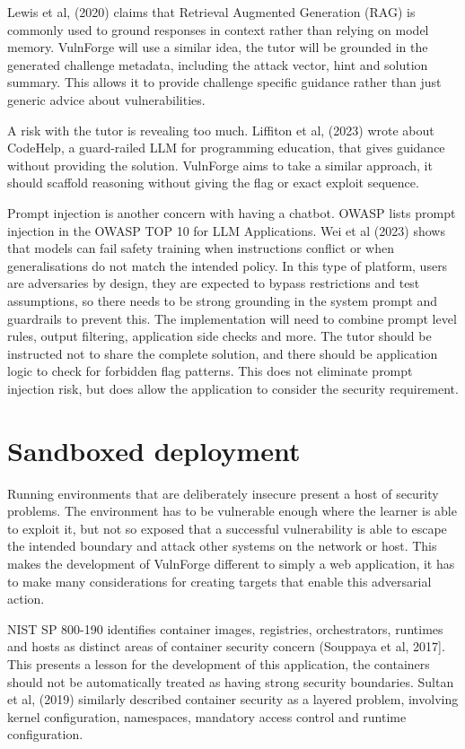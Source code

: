Lewis et al, (2020) \cite{lewis_retrieval-augmented_2021} claims that Retrieval Augmented Generation (RAG) is commonly used to ground responses in context rather than relying on model memory. VulnForge will use a similar idea, the tutor will be  grounded in the generated challenge metadata, including the attack vector, hint and solution summary. This allows it to provide challenge specific guidance rather than just generic advice about vulnerabilities. 

A risk with the tutor is revealing too much. Liffiton et al, (2023)\cite{liffiton_codehelp_2024} wrote about CodeHelp, a guard-railed LLM for programming education, that gives guidance without providing the solution. VulnForge aims to take a similar approach, it should scaffold reasoning without giving the flag or exact exploit sequence. 

Prompt injection is another concern with having a chatbot. OWASP lists prompt injection in the OWASP TOP 10 for LLM Applications\cite{editor_owasp_nodate}. Wei et al (2023)\cite{wei_jailbroken_2023} shows that models can fail safety training when instructions conflict or when generalisations do not match the intended policy. In this type of platform, users are adversaries by design, they are expected to bypass restrictions and test assumptions, so there needs to be strong grounding in the system prompt and guardrails to prevent this. The implementation will need to combine prompt level rules, output filtering, application side checks and more. The tutor should be instructed not to share the complete solution, and there should be application logic to check for forbidden flag patterns. This does not eliminate prompt injection risk, but does allow the application to consider the security requirement. 

\section{Sandboxed deployment}\label{sec:sandboxed}
Running environments that are deliberately insecure present a host of security problems. The environment has to be vulnerable enough where the learner is able to exploit it, but not so exposed that a successful vulnerability is able to escape the intended boundary and attack other systems on the network or host. This makes the development of VulnForge different to simply a web application, it has to make many considerations for creating targets that enable this adversarial action. 

NIST SP 800-190 identifies container images, registries, orchestrators, runtimes and hosts as distinct areas of container security concern (Souppaya et al, 2017]\cite{souppaya_application_2017}. This presents a lesson for the development of this application, the containers should not be automatically treated as having strong security boundaries. Sultan et al, (2019)\cite{noauthor_pdf_nodate} similarly described container security as a layered problem, involving kernel configuration, namespaces, mandatory access control and runtime configuration. 

